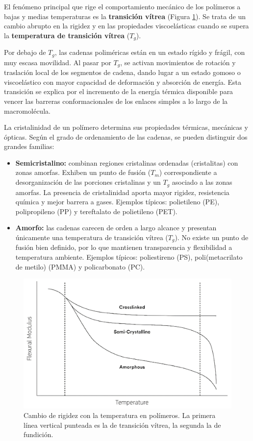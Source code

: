 El fenómeno principal que rige el comportamiento mecánico de los polímeros a bajas y medias temperaturas es la \textbf{transición vítrea} (Figura \ref{vitr}). Se trata de un cambio abrupto en la rigidez y en las propiedades viscoelásticas cuando se supera la \textbf{temperatura de transición vítrea} (\(T_{g}\)). 

Por debajo de \(T_{g}\), las cadenas poliméricas están  en un estado rígido y frágil, con muy escasa movilidad. Al pasar por \(T_{g}\), se activan movimientos de rotación y traslación local de los segmentos de cadena, dando lugar a un estado gomoso o viscoelástico con mayor capacidad de deformación y absorción de energía. Esta transición se explica por el incremento de la energía térmica disponible para vencer las barreras conformacionales de los enlaces simples a lo largo de la macromolécula.

La cristalinidad de un polímero determina sus propiedades térmicas, mecánicas y ópticas. Según el grado de ordenamiento de las cadenas, se pueden distinguir dos grandes familias:

\begin{itemize}
  \item \textbf{Semicristalino:} combinan regiones cristalinas ordenadas (cristalitas) con zonas amorfas. Exhiben un punto de fusión (\(T_m\)) correspondiente a desorganización de las porciones cristalinas y un \(T_g\) asociado a las zonas amorfas. La presencia de cristalinidad aporta mayor rigidez, resistencia química y mejor barrera a gases. Ejemplos típicos: polietileno (PE), polipropileno (PP) y tereftalato de polietileno (PET).
  \item \textbf{Amorfo:} las cadenas carecen de orden a largo alcance y presentan únicamente una temperatura de transición vítrea (\(T_g\)). No existe un punto de fusión bien definido, por lo que mantienen transparencia y flexibilidad a temperatura ambiente. Ejemplos típicos: poliestireno (PS), poli(metacrilato de metilo) (PMMA) y policarbonato (PC).
\end{itemize}

\begin{figure}[h!]
    \centering
    \includegraphics[width=0.8\linewidth]{imgs/tgap.png}
    \caption{Cambio de rigidez con la temperatura en polímeros. La primera línea vertical punteada es la de transición vítrea, la segunda la de fundición.}
    \label{vitr}
\end{figure}

